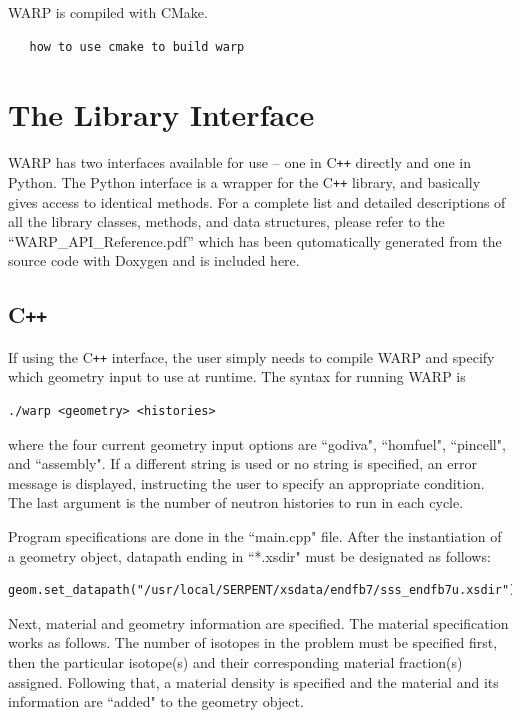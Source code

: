 \documentclass[twoside,a4paper]{refart}
\begin{document}
WARP is compiled with CMake.

\begin{verbatim}
   how to use cmake to build warp
\end{verbatim}


\section{The Library Interface}

WARP has two interfaces available for use -- one in C\texttt{++} directly and one in Python.  The Python interface is a wrapper for the C\texttt{++} library, and basically gives access to identical methods.  For a complete list and detailed descriptions of all the library classes, methods, and data structures, please refer to the ``WARP_API_Reference.pdf'' which has been qutomatically generated from the source code with Doxygen and is included here.

\subsection{C\texttt{++}}

If using the C\texttt{++} interface, the user simply needs to compile WARP and specify which geometry
input to use at runtime. The syntax for running WARP is

\begin{verbatim}
./warp <geometry> <histories>
\end{verbatim}

where the four current geometry input options are ``godiva", ``homfuel", ``pincell", and ``assembly". If 
a different string is used or no string is specified, an error message is displayed, instructing the 
user to specify an appropriate condition. The last argument is the number of neutron histories to run in 
each cycle.

Program specifications are done in the ``main.cpp" file. After the instantiation of a geometry object, 
datapath ending in ``*.xsdir" must be designated as follows:

\begin{verbatim}
geom.set_datapath("/usr/local/SERPENT/xsdata/endfb7/sss_endfb7u.xsdir");
\end{verbatim}

Next, material and geometry information are specified. The material specification works as follows. The 
number of isotopes in the problem must be specified first, then the particular isotope(s) and their 
corresponding material fraction(s) assigned. Following that, a material density is specified and the 
material and its information are ``added" to the geometry object.
\end{document}
